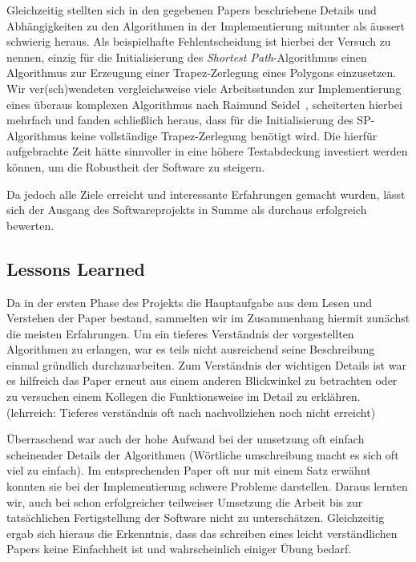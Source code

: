   Gleichzeitig stellten sich in den gegebenen Papers beschriebene Details und
  Abhängigkeiten zu den Algorithmen in der Implementierung mitunter als äussert
  schwierig heraus. Als beispielhafte Fehlentscheidung ist hierbei der Versuch
  zu nennen, einzig für die Initialisierung des \emph{Shortest Path}-Algorithmus
  einen Algorithmus zur Erzeugung einer Trapez-Zerlegung eines Polygons 
  einzusetzen. Wir ver(sch)wendeten vergleichsweise viele Arbeitsstunden zur
  Implementierung eines überaus komplexen Algorithmus nach Raimund
  Seidel~\cite{seidel91asimple}, scheiterten hierbei mehrfach und fanden
  schließlich heraus, dass für die Initialisierung des SP-Algorithmus keine
  vollständige Trapez-Zerlegung benötigt wird. Die hierfür aufgebrachte Zeit 
  hätte sinnvoller in eine höhere Testabdeckung investiert werden können, um die
  Robustheit der Software zu steigern.

  Da jedoch alle Ziele erreicht und interessante Erfahrungen gemacht wurden,
  lässt sich der Ausgang des Softwareprojekts in Summe als durchaus erfolgreich
  bewerten.

  \subsection{Lessons Learned}

  Da in der ersten Phase des Projekts die Hauptaufgabe aus dem Lesen und
  Verstehen der Paper bestand, sammelten wir im Zusammenhang hiermit zunächst
  die meisten Erfahrungen. Um ein tieferes Verständnis der vorgestellten
  Algorithmen zu erlangen, war es teils nicht ausreichend seine Beschreibung
  einmal gründlich durchzuarbeiten. Zum Verständnis der wichtigen Details ist
  war es hilfreich das Paper erneut aus einem anderen Blickwinkel zu betrachten
  oder zu versuchen einem Kollegen die Funktionsweise im Detail zu erklähren.
  (lehrreich: Tieferes verständnis oft nach nachvollziehen noch nicht erreicht)

  Überraschend war auch der hohe Aufwand bei der umsetzung oft einfach
  scheinender Details der Algorithmen (Wörtliche umschreibung macht es sich oft
  viel zu einfach). Im entsprechenden Paper oft nur mit einem Satz erwähnt
  konnten sie bei der Implementierung schwere Probleme darstellen. Daraus
  lernten wir, auch bei schon erfolgreicher teilweiser Umsetzung die Arbeit bis
  zur tatsächlichen Fertigstellung der Software nicht zu unterschätzen.
  Gleichzeitig ergab sich hieraus die Erkenntnis, dass das schreiben eines
  leicht verständlichen Papers keine Einfachheit ist und wahrscheinlich einiger
  Übung bedarf.


